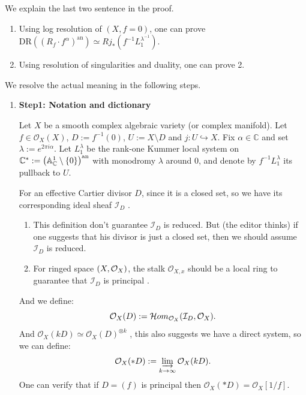 \begin{remark}\label{rmk:continue_prove_lemma_10.6}
    We explain the last two sentence in the proof.
    \begin{enumerate}
        \item Using log resolution of $(X,f=0)$, one can prove $\mathrm{DR}((R_f \cdot f^\alpha)^{\mathrm{an}}) \simeq R j_*(f^{-1} L_1^{\lambda^{-1}})$.
        \item Using resolution of singularities and duality, one can prove 2.
    \end{enumerate}
    We resolve the actual meaning in the following steps.
    \begin{enumerate}
        \item \textbf{Step1: Notation and dictionary}

              Let $X$ be a smooth complex algebraic variety (or complex manifold).
              Let $f\in \mathcal O_X(X)$, $D:=f^{-1}(0)$, $U:=X\setminus D$ and $j:U\hookrightarrow X$.
              Fix $\alpha\in \mathbb C$ and set $\lambda:=e^{2\pi i \alpha}$.
              Let $L_1^\lambda$ be the rank-one Kummer local system on $\mathbb{C}^\ast := \left(\mathbb{A}^1_{\mathbb{C}} \setminus \{0\}\right)^\mathrm{an}$ with monodromy
              $\lambda$ around $0$, and denote by $f^{-1}L_1^\lambda$ its pullback to $U$.

              For an effective Cartier divisor $D$, since it is a closed set, so we have its corresponding ideal sheaf $\mathcal I_D$
              \cite[\href{https://stacks.math.columbia.edu/tag/01WR}{Tag 01WR}]{stacks-project}.
              \begin{enumerate}
                  \item This definition don't guarantee $\mathcal I_D$ is reduced.
                        But (the editor thinks) if one suggests that his divisor is just a closed set, then we should assume $\mathcal I_D$ is reduced.
                  \item For ringed space $(X,\mathcal{O}_X)$, the stalk $\mathcal{O}_{X,x}$ should be a local ring
                        to guarantee that $\mathcal I_D$ is principal \cite[\href{https://stacks.math.columbia.edu/tag/0B8M}{Tag 0B8M}]{stacks-project}.
              \end{enumerate}
              And we define:
              \[
                  \mathcal{O}_X(D) := \mathcal Hom_{\mathcal O_X}(\mathcal I_D, \mathcal O_X).
              \]
              And $\mathcal O_X(kD)\simeq \mathcal O_X(D)^{\otimes k}$ \cite[\href{https://stacks.math.columbia.edu/tag/02OP}{Tag 02OP}]{stacks-project},
              this also suggests we have a direct system, so we can define:
              \[
                  \mathcal O_X(*D):=\varinjlim_{k\to\infty}\mathcal O_X(kD).
              \]
              One can verify that if $D=(f)$ is principal then $\mathcal O_X(*D)=\mathcal O_X[1/f]$.


\end{enumerate}
\end{remark}
